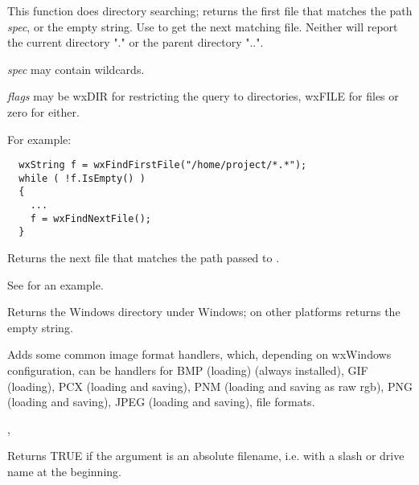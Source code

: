 This function does directory searching; returns the first file
that matches the path {\it spec}, or the empty string. Use  to
get the next matching file. Neither will report the current directory "." or the
parent directory "..".

{\it spec} may contain wildcards.

{\it flags} may be wxDIR for restricting the query to directories, wxFILE for files or zero for either.

For example:

\begin{verbatim}
  wxString f = wxFindFirstFile("/home/project/*.*");
  while ( !f.IsEmpty() )
  {
    ...
    f = wxFindNextFile();
  }
\end{verbatim}

\label{wxfindnextfile}


Returns the next file that matches the path passed to .

See  for an example.

\label{wxgetosdirectory}


Returns the Windows directory under Windows; on other platforms returns the empty string.

\label{wxinitallimagehandlers}


Adds some common image format handlers, which, depending on wxWindows
configuration, can be handlers for BMP (loading) (always installed), GIF
(loading), PCX (loading and saving), PNM (loading and saving as raw rgb),
PNG (loading and saving), JPEG (loading and saving), file formats.


, 



Returns TRUE if the argument is an absolute filename, i.e. with a slash
or drive name at the beginning.

